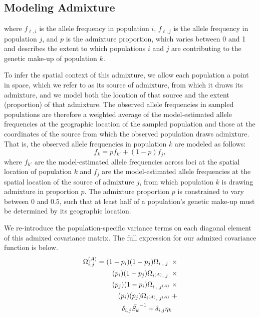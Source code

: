 \documentclass[12pt]{article}
\begin{document}
\subsection*{Modeling Admixture}
where $f_{\ell,i}$ is the allele frequency in population $i$, $f_{\ell,j}$ is the allele frequency in population $j$, and $p$ is the admixture proportion, which varies between 0 and 1 and describes the extent to which populations $i$ and $j$ are contributing to the genetic make-up of population $k$.

 To infer the spatial context of this admixture, we allow each population a point in space, which we refer to as its source of admixture, from which it draws its admixture, and we model both the location of that source and the extent (proportion) of that admixture.  The observed allele frequencies in sampled populations are therefore a weighted average of the model-estimated allele frequencies at the geographic location of the sampled population and those at the coordinates of the source from which the observed population draws admixture.  That is, the observed allele frequencies in population $k$ are modeled as follows:
 \begin{equation}
 f_{k} = pf_{k'} + (1-p)f_{j},
 \end{equation}
 where $f_{k'}$ are the model-estimated allele frequencies across loci at the spatial location of population $k$ and $f_{j}$ are the model-estimated allele frequencies at the spatial location of the source of admixture $j$, from which population $k$ is drawing admixture in proportion $p$.  The admixture proportion $p$ is constrained to vary between 0 and 0.5, such that at least half of a population's genetic make-up must be determined by its geographic location.

 We re-introduce the population-specific variance terms on each diagonal element of this admixed covariance matrix.  The full expression for our admixed covariance function is below.
 \begin{alignat}{3}
 \label{eq:admixed_covariance_2}
 \Omega^{(A)}_{i,j} = (1-p_i)(1-p_j) \Omega_{i\;,\;j\;} \; \times&\\
 (p_i)(1-p_j) \Omega_{i^{(A)},\;j\;} \; \times   \notag&\\
 (p_j)(1-p_i) \Omega_{i\;,\;j^{(A)}} \; \times   \notag&\\
 (p_i)(p_j) \Omega_{i^{(A)},\;j^{(A)}} \; +   \notag&\\
 \delta_{i,j} \bar{S_k}^{-1} + \delta_{i,j} \eta_k \phantom{+} \notag&
 \end{alignat}
\end{document}
